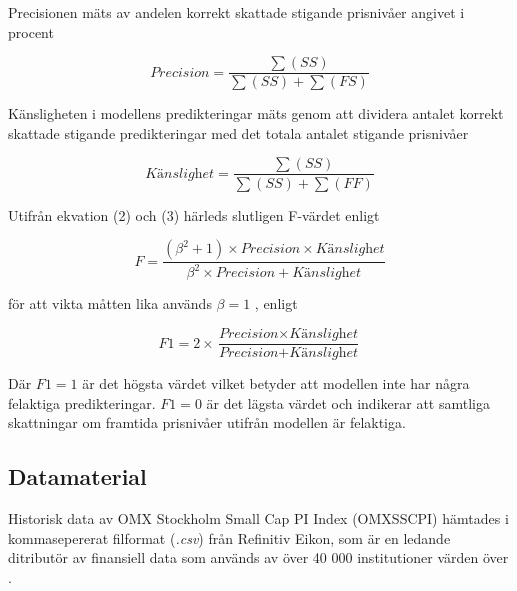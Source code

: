 \documentclass[12pt]{article}
\begin{document}
Precisionen mäts av andelen korrekt skattade stigande prisnivåer angivet i procent


\begin{equation}
    \textit{Precision} = \frac{\sum(SS)}{\sum(SS)+\sum(FS)}
\end{equation}

Känsligheten i modellens predikteringar mäts genom att dividera antalet korrekt skattade stigande predikteringar med det totala antalet stigande prisnivåer

\begin{equation}
    \textit{Känslighet} = \frac{\sum(SS)}{\sum(SS)+\sum(FF)}
\end{equation}


Utifrån ekvation (2) och (3) härleds slutligen F-värdet enligt

\begin{equation*}
    \textit{F} = \frac{(\beta^2+1) \times \textit{Precision} \times \textit{Känslighet}}{\beta^2 \times \textit{Precision} + \textit{Känslighet}}
\end{equation*}

för att vikta måtten lika används $\beta=1$ \parencite{ModelValidation}, enligt

\begin{equation*}
    \textit{F1}= 2 \times \frac{\textit{Precision} \times \textit{Känslighet}}{\textit{Precision} + \textit{Känslighet}}
\end{equation*}

Där $F1=1$ är det högsta värdet vilket betyder att modellen inte har några felaktiga predikteringar. $F1=0$ är det lägsta värdet och indikerar att samtliga skattningar om framtida prisnivåer utifrån modellen är felaktiga.





\newpage
\subsection{Datamaterial}
Historisk data av OMX Stockholm Small Cap PI Index (OMXSSCPI) hämtades i kommasepererat filformat (\emph{.csv}) från Refinitiv Eikon, som är en ledande ditributör av finansiell data som används av över 40 000 institutioner värden över \parencite{Eikon}. 



\begin{table}[H]
\centering
\caption{Deskriptiv statitistik av stängningskurs}
\label{tab:my-table}
\end{table}
\end{document}
